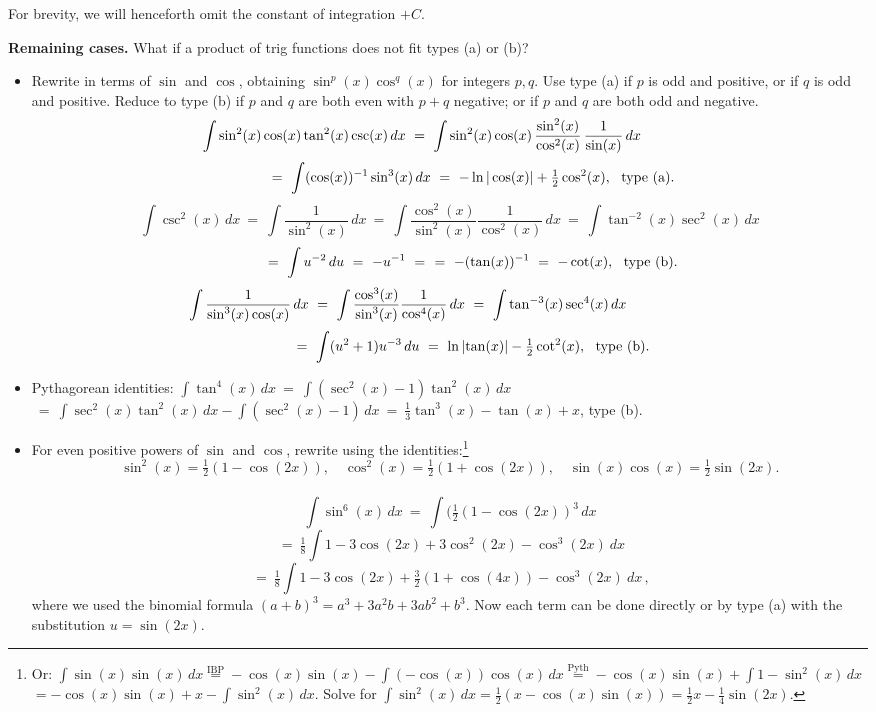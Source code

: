 \documentclass[11pt]{article}
\begin{document}
\noindent
For brevity, we will henceforth omit the constant of integration $+C$.


\pagebreak

\noindent
{\bf Remaining cases.} What if a product of trig functions does not fit 
types (a) or (b)?

\begin{itemize}

\item  Rewrite in terms of $\sin$ and $\cos$, obtaining  
$\sin^{p}(x)\cos^q(x)$ for integers $p,q$.
Use type (a) if $p$ is odd and positive, or if $q$ is odd and positive.
Reduce to type (b) if $p$ and $q$ are both even with $p+q$ negative;
or if $p$ and $q$ are both odd and negative.\\
$$\hspace{-4.0em}
\int \sin^2(x)\cos(x)\tan^2(x)\csc(x)\,dx 
\ =\ \int \sin^2(x)\cos(x)\,\frac{\sin^2(x)}{\cos^2(x)}\,\frac{1}{\sin(x)}\,dx
$$
$$\hspace{3.0em}
\ =\ \int (\cos(x))^{-1}\sin^{3}(x)\,dx
\ =\  -\ln|\cos(x)|+\tfrac12\cos^2(x), \ \ 
\text{type (a)}.
$$
$$
\int \csc^2(x)\,dx 
\ =\ \int \frac{1}{\sin^2(x)}\,dx
\ =\ \int \frac{\cos^2(x)}{\sin^2(x)}\frac{1}{\cos^2(x)}\,dx
\ =\ \int \tan^{-2}(x)\sec^2(x)\,dx
$$
$$\hspace{3.0em}
\ =\ \int u^{-2}\,du
\ =\  -u^{-1} \ = \
\ = \ -(\tan(x))^{-1} \ = \ -\cot(x), \ \ 
\text{type (b)}.
$$
$$\hspace{-6.0em}
\int \frac{1}{\sin^3(x)\cos(x)}\,dx
\ =\ \int \frac{\cos^3(x)}{\sin^3(x)}\frac{1}{\cos^4(x)}\,dx
\ =\ \int \tan^{-3}(x)\sec^4(x)\,dx
$$
$$\hspace{3.0em}
\ =\ \int (u^2+1)u^{-3}\,du
\ =\  \ln|\!\tan(x)| -\tfrac12\cot^2(x), \ \ 
\text{type (b)}.
$$



\item Pythagorean identities: \quad
$\int \tan^4(x)\,dx\ =\ \int (\sec^2(x)-1)\tan^2(x)\,dx $\\
$\ =\ \int \sec^2(x)\tan^2(x)\,dx - \int (\sec^2(x)-1)\,dx \ =\ \frac13\tan^3(x)-\tan(x) + x$,
type (b).

\item For even positive powers of $\sin$ and $\cos$,
rewrite using the identities:\footnote{
Or: $\int\sin(x)\sin(x)\,dx 
\stackrel{\text{IBP}}= -\cos(x)\sin(x)-\int (-\cos(x))\cos(x)\,dx 
\stackrel{\text{Pyth}}= -\cos(x)\sin(x)+\int 1-\sin^2(x)\,dx$\\
$=-\cos(x)\sin(x)+x-\int\sin^2(x)\,dx$. Solve for $\int\sin^2(x)\,dx=\frac12(x-\cos(x)\sin(x))
=\frac12 x-\frac14\sin(2x)$.
}
\\[-.6em]
$$\sin^2(x)=\tfrac12(1{-}\cos(2x)), 
\quad
\cos^2(x)=\tfrac12(1{+}\cos(2x)),\quad
\sin(x)\cos(x)=\tfrac12\sin(2x).
$$
\\[-1.7em]
$$
\int \sin^6(x)\,dx 
\ =\ 
\int (\tfrac12(1{-}\cos(2x))^3\,dx
$$
$$
\ =\ 
\tfrac18\int 1- 3\cos(2x)+3\cos^2(2x)-\cos^3(2x)\ dx
$$
$$
\ =\ 
\tfrac18\int 1-3\cos(2x)+\tfrac32(1{+}\cos(4x))-\cos^3(2x)\ dx\,,
$$
where we used the binomial formula $(a{+}b)^3=a^3+3a^2b + 3ab^2+b^3$.
Now each term can be done directly or by type (a)
with the substitution $u=\sin(2x)$.

\end{itemize}
\end{document}
